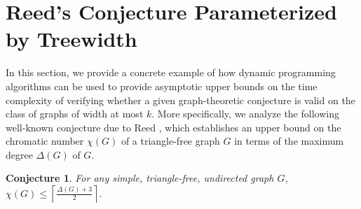 \documentclass[11pt,a4paper]{article}
\newtheorem{conjecture}[theorem]{Conjecture}
\newcommand{\treewidthvalue}{k}
\newcommand{\cliquenumber}{\omega}
\newcommand{\maxDegree}{\Delta}
\newcommand{\chromaticnumber}{\chi}
\newcommand{\agraph}{G}
\begin{document}
\section{Reed's Conjecture Parameterized by Treewidth}
\label{ReedConjecture}

In this section, we provide a concrete example of how dynamic programming algorithms can be used to provide asymptotic upper bounds on the time complexity of verifying whether a given graph-theoretic conjecture is valid on the class of graphs of width at most $\treewidthvalue$. More specifically, we analyze the following well-known conjecture due to Reed \cite{reed1998omega}, which establishes an upper bound on the chromatic number $\chi(\agraph)$ of a triangle-free graph $\agraph$ in terms of the maximum degree $\maxDegree(\agraph)$ of $\agraph$.

\begin{conjecture}
\label{conjecture:Reed-triangle-free}
For any simple, triangle-free, undirected graph $\agraph$,
$\chromaticnumber(\agraph)\leq \left\lceil \frac{\maxDegree(\agraph) + 3}{2}\right\rceil. $
\end{conjecture}
\end{document}
